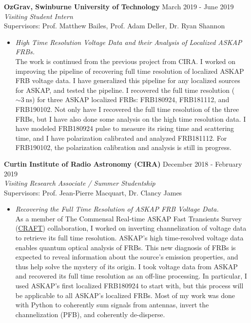 \documentclass[margin, 10pt]{res} %
\begin{document}
\begin{resume}
{\bf OzGrav, Swinburne University of Technology} \hfill March 2019 - June 2019 \\
{\sl Visiting Student Intern} \\
Supervisors: Prof. Matthew Bailes, Prof. Adam Deller, Dr. Ryan Shannon
\begin{itemize}
\item[] {\sl High Time Resolution Voltage Data and their Analysis of Localized ASKAP FRBs.}\\
The work is continued from the previous project from CIRA. I worked on improving the pipeline of recovering full time resolution of localized ASKAP FRB voltage data. I have generalized this pipeline for any localized sources for ASKAP, and tested the pipeline. I recovered the full time resolution ($\sim 3~\mathrm{ns}$) for three ASKAP localized FRBs: FRB180924, FRB181112, and FRB190102. Not only have I recovered the full time resolution of the three FRBs, but I have also done some analysis on the high time resolution data. I have modeled FRB180924 pulse to measure its rising time and scattering time, and I have polarization calibrated and analyzed FRB181112. For FRB190102, the polarization calibration and analysis is still in progress. %
\end{itemize} 

{\bf Curtin Institute of Radio Astronomy (CIRA)} \hfill December 2018 - February 2019 \\
{\sl Visiting Research Associate / Summer Studentship} \\
Supervisors: Prof. Jean-Pierre Macquart, Dr. Clancy James
\begin{itemize}
\item[] {\sl Recovering the Full Time Resolution of ASKAP FRB Voltage Data.}\\
As a member of The Commensal Real-time ASKAP Fast Transients Survey (\href{http://astronomy.curtin.edu.au/research/craft/}{CRAFT}) collaboration, I worked on inverting channelization of voltage data to retrieve its full time resolution. ASKAP's high time-resolved voltage data enables quantum optical analysis of FRBs. This new diagnosis of FRBs is expected to reveal information about the source's emission properties, and thus help solve the mystery of its origin. I took voltage data from ASKAP and recovered its full time resolution as an off-line processing. In particular, I used ASKAP's first localized FRB180924 to start with, but this process will be applicable to all ASKAP's localized FRBs. Most of my work was done with Python to coherently sum signals from antennas, invert the channelization (PFB), and coherently de-disperse.
\end{itemize} 


\end{resume}
\end{document}
